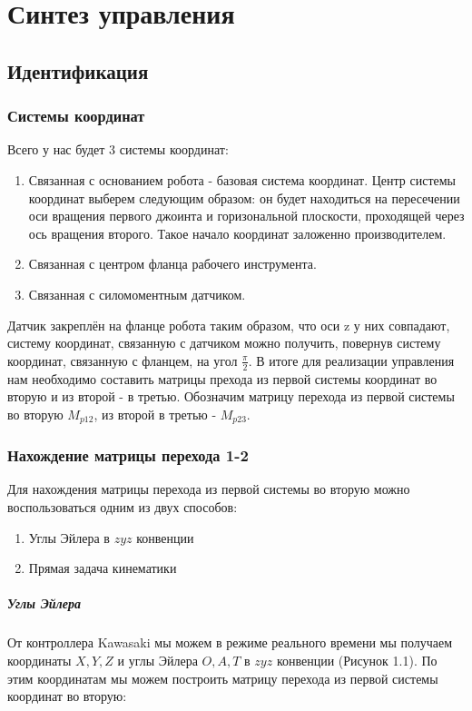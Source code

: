 \documentclass[a4paper,14pt,russian]{extreport} \usepackage{extsizes}
\begin{document}
	\chapter{Синтез управления}
	\section{Идентификация}
	\subsection{Системы координат}
	Всего у нас будет 3 системы координат: 
	\begin{enumerate}
		\item Связанная с основанием робота - базовая система координат. Центр системы координат выберем следующим образом: он будет находиться на пересечении оси вращения первого джоинта и горизональной плоскости, проходящей через ось вращения второго. Такое начало координат заложенно производителем. 
		\item Связанная с центром фланца рабочего инструмента.
		\item Связанная с силомоментным датчиком. 		
	\end{enumerate}
	Датчик закреплён на фланце робота таким образом, что оси z у них совпадают, систему координат, связанную с датчиком можно получить, повернув систему координат, связанную с фланцем, на угол $\frac{\pi}{2}$.
	В итоге для реализации управления нам необходимо составить матрицы прехода из первой системы координат во вторую и из второй - в третью.
	Обозначим матрицу перехода из первой системы во вторую ${M_{p12}}$, из второй в третью - ${M_{p23}}$.	
	\subsection{Нахождение матрицы перехода 1-2}
	Для нахождения матрицы перехода из первой системы во вторую можно воспользоваться одним из двух способов: 
	\begin{enumerate}
		\item Углы Эйлера в $zyz$ конвенции
		\item Прямая задача кинематики
	\end{enumerate}
	\paragraph{Углы Эйлера}
	От контроллера Kawasaki мы можем в режиме реального времени мы получаем координаты $X,Y,Z$ и углы Эйлера $O, A, T$ в $zyz$ конвенции (Рисунок 1.1). По этим координатам мы можем построить матрицу перехода из первой системы координат во вторую:
	
\end{document}
